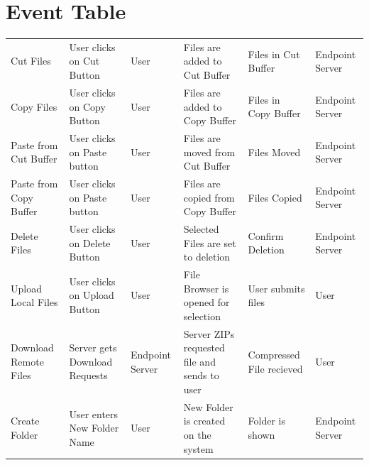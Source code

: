 \documentclass[12pt]{article}
\newenvironment{changemargin}[2]{%
\begin{list}{}{%
\setlength{\topsep}{0pt}%
\setlength{\leftmargin}{#1}%
\setlength{\rightmargin}{#2}%
\setlength{\listparindent}{\parindent}%
\setlength{\itemindent}{\parindent}%
\setlength{\parsep}{\parskip}%
}%
\item[]}{\end{list}}
\begin{document}
\fontsize{12pt}{16pt}\selectfont

\section{Event Table}
\begin{changemargin}{-1cm}{-1cm}
\vfill
\begin{center}
\begin{tabular}{ | C{2cm} | C{3cm} | C{2cm} | C{3cm} | C{3cm} | C{2cm} | }
	\hline
	 &
	 &
	 &
	 &
	 &
	 \\
	\hline\hline
	Cut Files &
	User clicks on Cut Button & User &
	Files are added to Cut Buffer &
	Files in Cut Buffer &
	Endpoint Server \\ \hline

	Copy Files & User clicks on Copy Button & User &
	Files are added to Copy Buffer &
	Files in Copy Buffer &
	Endpoint Server \\ \hline

	Paste from Cut Buffer &
	User clicks on Paste button &
	User &
	Files are moved from Cut Buffer &
	Files Moved &
	Endpoint Server \\ \hline

	Paste from Copy Buffer &
	User clicks on Paste button &
	User &
	Files are copied from Copy Buffer &
	Files Copied &
	Endpoint Server \\ \hline

	Delete Files &
	User clicks on Delete Button &
	User &
	Selected Files are set to deletion &
	Confirm Deletion &
	Endpoint Server \\ \hline

	Upload Local Files &
	User clicks on Upload Button &
	User &
	File Browser is opened for selection &
	User submits files &
	User \\ \hline

	Download Remote Files &
	Server gets Download Requests &
	Endpoint Server &
	Server ZIPs requested file and sends to user &
	Compressed File recieved &
	User \\ \hline

	Create Folder &
	User enters New Folder Name &
	User &
	New Folder is created on the system &
	Folder is shown &
	Endpoint Server \\ \hline

\end{tabular}
\end{center}
\vfill
\end{changemargin}
\end{document}
